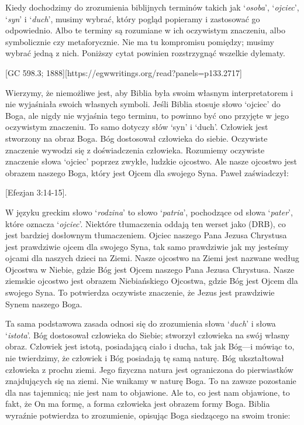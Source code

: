 Kiedy dochodzimy do zrozumienia biblijnych terminów takich jak ‘\textit{osoba}’, ‘\textit{ojciec}’, ‘\textit{syn}’ i ‘\textit{duch}’, musimy wybrać, który pogląd popieramy i zastosować go odpowiednio. Albo te terminy są rozumiane w ich oczywistym znaczeniu, albo symbolicznie czy metaforycznie. Nie ma tu kompromisu pomiędzy; musimy wybrać jedną z nich. Poniższy cytat powinien rozstrzygnąć wszelkie dylematy.

[GC 598.3; 1888][https://egwwritings.org/read?panels=p133.2717]

Wierzymy, że niemożliwe jest, aby Biblia była swoim własnym interpretatorem i nie wyjaśniała swoich własnych symboli. Jeśli Biblia stosuje słowo ‘ojciec’ do Boga, ale nigdy nie wyjaśnia tego terminu, to powinno być ono przyjęte w jego oczywistym znaczeniu. To samo dotyczy słów ‘syn’ i ‘duch’. Człowiek jest stworzony na obraz Boga. Bóg dostosował człowieka do siebie. Oczywiste znaczenie wywodzi się z doświadczenia człowieka. Rozumiemy oczywiste znaczenie słowa ‘ojciec’ poprzez zwykłe, ludzkie ojcostwo. Ale nasze ojcostwo jest obrazem naszego Boga, który jest Ojcem dla swojego Syna. Paweł zaświadczył:

[Efezjan 3:14-15].

W języku greckim słowo ‘\textit{rodzina}’ to słowo ‘\textit{patria}’, pochodzące od słowa ‘\textit{pater}’, które oznacza ‘\textit{ojciec}’. Niektóre tłumaczenia oddają ten werset jako  (DRB), co jest bardziej dosłownym tłumaczeniem. Ojciec naszego Pana Jezusa Chrystusa jest prawdziwie ojcem dla swojego Syna, tak samo prawdziwie jak my jesteśmy ojcami dla naszych dzieci na Ziemi. Nasze ojcostwo na Ziemi jest nazwane według Ojcostwa w Niebie, gdzie Bóg jest Ojcem naszego Pana Jezusa Chrystusa. Nasze ziemskie ojcostwo jest obrazem Niebiańskiego Ojcostwa, gdzie Bóg jest Ojcem dla swojego Syna. To potwierdza oczywiste znaczenie, że Jezus jest prawdziwie Synem naszego Boga.

Ta sama podstawowa zasada odnosi się do zrozumienia słowa ‘\textit{duch}’ i słowa ‘\textit{istota}’. Bóg dostosował człowieka do Siebie; stworzył człowieka na swój własny obraz. Człowiek jest istotą, posiadającą ciało i ducha, tak jak Bóg—i mówiąc to, nie twierdzimy, że człowiek i Bóg posiadają tę samą naturę. Bóg ukształtował człowieka z prochu ziemi. Jego fizyczna natura jest ograniczona do pierwiastków znajdujących się na ziemi. Nie wnikamy w naturę Boga. To na zawsze pozostanie dla nas tajemnicą; nie jest nam to objawione. Ale to, co jest nam objawione, to fakt, że On ma formę, a forma człowieka jest obrazem formy Boga. Biblia wyraźnie potwierdza to zrozumienie, opisując Boga siedzącego na swoim tronie:

